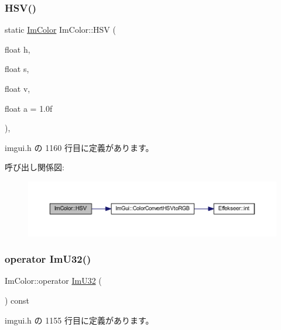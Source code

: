 \subsubsection{\texorpdfstring{H\+S\+V()}{HSV()}}
{\footnotesize\ttfamily static \mbox{\hyperlink{struct_im_color}{Im\+Color}} Im\+Color\+::\+H\+SV (\begin{DoxyParamCaption}\item[{float}]{h,  }\item[{float}]{s,  }\item[{float}]{v,  }\item[{float}]{a = {\ttfamily 1.0f} }\end{DoxyParamCaption})\hspace{0.3cm}{\ttfamily [inline]}, {\ttfamily [static]}}



 imgui.\+h の 1160 行目に定義があります。

呼び出し関係図\+:\nopagebreak
\begin{figure}[H]
\begin{center}
\leavevmode
\includegraphics[width=350pt]{struct_im_color_ac8cb52119648523038818a613becf010_cgraph}
\end{center}
\end{figure}
\mbox{\label{struct_im_color_a4f4fc53e0676d50404d6d5ffcf16637f}} 
\subsubsection{\texorpdfstring{operator Im\+U32()}{operator ImU32()}}
{\footnotesize\ttfamily Im\+Color\+::operator \mbox{\hyperlink{imgui_8h_a118cff4eeb8d00e7d07ce3d6460eed36}{Im\+U32}} (\begin{DoxyParamCaption}{ }\end{DoxyParamCaption}) const\hspace{0.3cm}{\ttfamily [inline]}}



 imgui.\+h の 1155 行目に定義があります。

